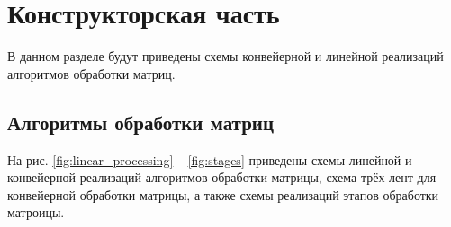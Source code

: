\chapter{Конструкторская часть}

В данном разделе будут приведены схемы конвейерной и линейной реализаций алгоритмов обработки матриц.

\section{Алгоритмы обработки матриц}

На рис. \ref{fig:linear_processing} -- \ref{fig:stages} приведены схемы линейной и конвейерной реализаций алгоритмов обработки матрицы, схема трёх лент для конвейерной обработки матрицы, а также схемы реализаций этапов обработки матроицы.



